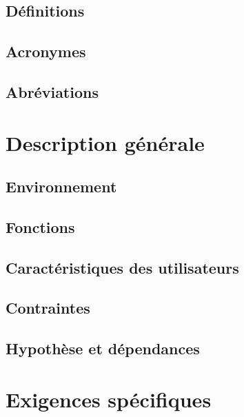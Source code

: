 \documentclass{scrreprt}
\begin{document}
\section{Définitions}
\section{Acronymes}
\section{Abréviations}
\chapter{Description générale}
\section{Environnement}
\section{Fonctions}
\section{Caractéristiques des utilisateurs}
\section{Contraintes}
\section{Hypothèse et dépendances}
\chapter{Exigences spécifiques}
\end{document}
